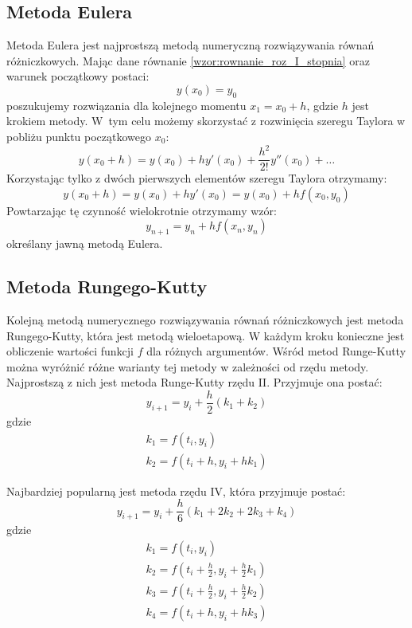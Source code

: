 \subsection*{Metoda Eulera}
Metoda Eulera jest najprostszą metodą numeryczną rozwiązywania równań różniczkowych. Mając dane równanie \eqref{wzor:rownanie_roz_I_stopnia} oraz warunek początkowy postaci:
\begin{equation}
	y(x_0) = y_0	
\end{equation}
poszukujemy rozwiązania dla kolejnego momentu $x_1 = x_0 + h$, gdzie $h$ jest krokiem metody. W~tym celu możemy skorzystać z rozwinięcia szeregu Taylora w pobliżu punktu początkowego $x_0$:
\begin{equation}
	y(x_0 + h) = y(x_0) + hy'(x_0) + \frac{h^2}{2!}y''(x_0) + \hdots
\end{equation}
Korzystając tylko z dwóch pierwszych elementów szeregu Taylora otrzymamy:
\begin{equation}
	y(x_0 + h) = y(x_0) + hy'(x_0) = y(x_0) + hf(x_0,y_0)
\end{equation}
Powtarzając tę czynność wielokrotnie otrzymamy wzór:
\begin{equation}
	y_{n+1} = y_{n} + hf(x_n,y_n)
\end{equation}
określany jawną metodą Eulera.

\subsection*{Metoda Rungego-Kutty}
Kolejną metodą numerycznego rozwiązywania równań różniczkowych jest metoda \mbox{Rungego-Kutty}, która jest metodą wieloetapową. W każdym kroku konieczne jest obliczenie wartości funkcji $f$ dla różnych argumentów. Wśród metod Runge-Kutty można wyróżnić różne warianty tej metody w zależności od rzędu metody. Najprostszą z nich jest metoda Runge-Kutty rzędu II. Przyjmuje ona postać:
\begin{equation}
	y_{i+1} = y_i + \frac{h}{2}(k_1 + k_2)
\end{equation}
gdzie
$$\begin{array}{c}
	k_1 = f(t_i,y_i) \\
	k_2 = f(t_i + h, y_i + hk_1)
\end{array}$$

Najbardziej popularną jest metoda rzędu IV, która przyjmuje postać:
\begin{equation}
	y_{i+1} = y_i + \frac{h}{6}(k_1 + 2k_2 + 2k_3 + k_4)
\end{equation}
gdzie
$$\begin{array}{c}
	k_1 = f(t_i,y_i) \\
	k_2 = f(t_i + \frac{h}{2}, y_i + \frac{h}{2}k_1) \\
	k_3 = f(t_i + \frac{h}{2}, y_i + \frac{h}{2}k_2) \\
	k_4 = f(t_i + h,y_i + hk_3) \\
\end{array}$$

